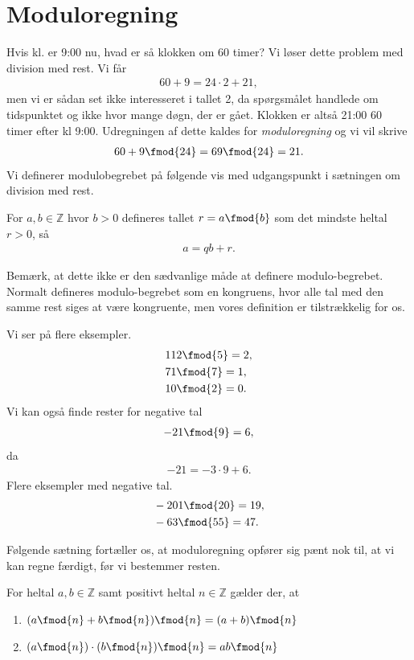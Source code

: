 \section*{Moduloregning}
Hvis kl. er 9:00 nu, hvad er så klokken om 60 timer? Vi løser dette problem med division med rest. Vi får
\begin{align*}
	60 + 9 = 24\cdot 2 + 21,
\end{align*}
men vi er sådan set ikke interesseret i tallet 2, da spørgsmålet handlede om tidspunktet og ikke hvor mange døgn, der er gået. Klokken er altså 21:00 60 timer efter kl 9:00. Udregningen af dette kaldes for \textit{moduloregning} og vi vil skrive
\begin{align*}
	60 + 9 \fmod{24} = 69 \fmod{24} = 21.
\end{align*}
Vi definerer modulobegrebet på følgende vis med udgangspunkt i sætningen om division med rest. 
\begin{defn}[Modulo]
	For $a, b\in \mathbb{Z}$ hvor $b>0$ defineres tallet $r = a \fmod{b}$ som det mindste heltal $r>0$, så
	\begin{align*}
		a = qb + r.
	\end{align*}
\end{defn}
Bemærk, at dette ikke er den sædvanlige måde at definere modulo-begrebet. Normalt defineres modulo-begrebet som en kongruens, hvor alle tal med den samme rest siges at være kongruente, men vores definition er tilstrækkelig for os.
\begin{exa}
	Vi ser på flere eksempler.
	\begin{align*}
		&112 \fmod{5} = 2, \\
		&71 \fmod{7} = 1, \\
		&10 \fmod{2} = 0.
	\end{align*}
	Vi kan også finde rester for negative tal
	\begin{align*}
		-21 \fmod{9} = 6, 
	\end{align*}
	da 
	\begin{align*}
		-21 = -3\cdot 9 + 6.
	\end{align*}
	Flere eksempler med negative tal.
	\begin{align*}
		&-201 \fmod{20} = 19,\\
		&-63 \fmod{55} = 47.
	\end{align*}
\end{exa}
Følgende sætning fortæller os, at moduloregning opfører sig pænt nok til, at vi kan regne færdigt, før vi bestemmer resten. 
\begin{setn}\label{setn:modulus}
	For heltal $a,b\in \mathbb{Z}$ samt positivt heltal $n\in \mathbb{Z}$ gælder der, at 
	\begin{enumerate}[label=\roman*)]
		\item $(a \fmod{n} + b\fmod{n})\fmod{n} = (a+b)\fmod{n}$\\
		\item $(a\fmod{n})\cdot(b\fmod{n})\fmod{n} = ab \fmod{n}$
	\end{enumerate}		
\end{setn}
